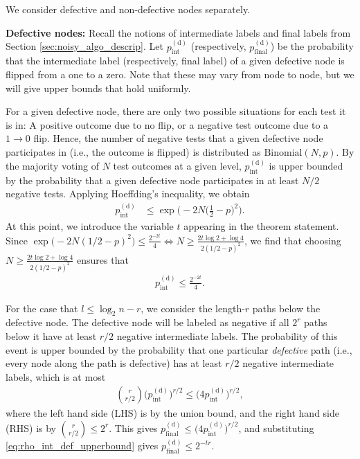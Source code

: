 We consider defective and non-defective nodes separately.

\textbf{Defective nodes:} Recall the notions of intermediate labels and final labels from Section \ref{sec:noisy_algo_descrip}.  Let $p_{\text{int}}^{(\text{d})}$ (respectively, $p_{\text{final}}^{(\text{d})}$) be the probability that the intermediate label (respectively, final label) of a given defective node is flipped from a one to a zero. Note that these may vary from node to node, but we will give upper bounds that hold uniformly.

For a given defective node, there are only two possible situations for each test it is in: A positive outcome due to no flip, or a negative test outcome due to a $1\rightarrow0$ flip. Hence, the number of negative tests that a given defective node participates in (i.e., the outcome is flipped) is distributed as $\text{Binomial}(N,p)$. By the majority voting of $N$ test outcomes at a given level, $p_{\text{int}}^{(\text{d})}$ is upper bounded by the probability that a given defective node participates in at least $N/2$ negative tests. Applying Hoeffding's inequality, we obtain
\begin{align}
    p_{\text{int}}^{(\text{d})}&\leq\exp\bigg(-2N\Big(\frac{1}{2}-p\Big)^2\bigg).
\end{align}
At this point, we introduce the variable $t$ appearing in the theorem statement. Since $\exp\big(-2N(1/2-p)^2\big)\leq \frac{2^{-2t}}{4}\Leftrightarrow N\geq \frac{2t\log2+\log4}{2(1/2-p)^2}$, we find that choosing $N\geq \frac{2t\log2+\log4}{2(1/2-p)^2}$ ensures that
\begin{align}
    p_{\text{int}}^{(\text{d})}\leq\frac{2^{-2t}}{4}. \label{eq:rho_int_def_upperbound}
\end{align}

For the case that $l\leq\log_2n-r$, we consider the length-$r$ paths below the defective node. The defective node will be labeled as negative if all $2^r$ paths below it have at least $r/2$ negative intermediate labels. The probability of this event is upper bounded by the probability that one particular \textit{defective} path (i.e., every node along the path is defective) has at least $r/2$ negative intermediate labels, which is at most
\begin{align}
    {r\choose r/2}\big(p_{\text{int}}^{(\text{d})}\big)^{r/2}\leq\big(4p_{\text{int}}^{(\text{d})}\big)^{r/2}, \label{eq:p_final_bound}
\end{align}
where the left hand side (LHS) is by the union bound, and the right hand side (RHS) is by ${r\choose r/2}\leq2^r$.
This gives $p_{\text{final}}^{(\text{d})}\leq\big(4p_{\text{int}}^{(\text{d})}\big)^{r/2}$, and substituting \eqref{eq:rho_int_def_upperbound} gives $p_{\text{final}}^{(\text{d})}\leq2^{-tr}$. 

